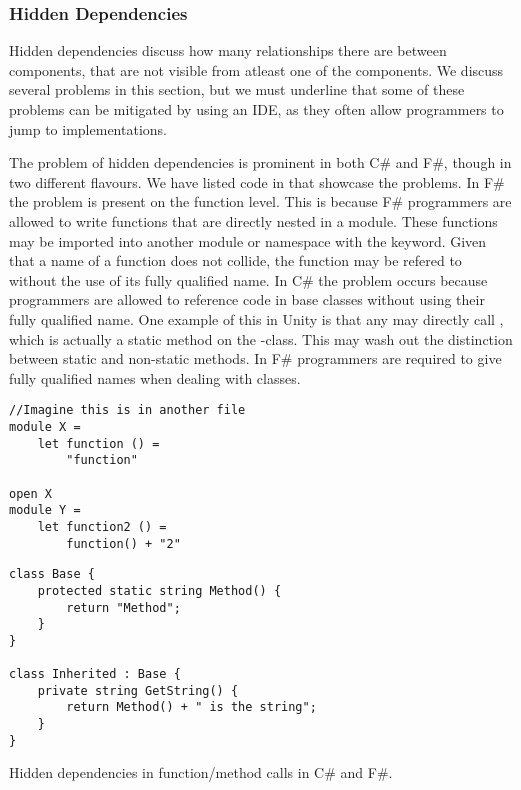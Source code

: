 \subsubsection{Hidden Dependencies}
Hidden dependencies discuss how many relationships there are between components, that are not visible from atleast one of the components. We discuss several problems in this section, but we must underline that some of these problems can be mitigated by using an \gls{IDE}, as they often allow programmers to jump to implementations.

The problem of hidden dependencies is prominent in both C\# and F\#, though in two different flavours. We have listed code in  that showcase the problems. In F\# the problem is present on the function level. This is because F\# programmers are allowed to write functions that are directly nested in a module. These functions may be imported into another module or namespace with the  keyword. Given that a name of a function does not collide, the function may be refered to without the use of its fully qualified name. In C\# the problem occurs because programmers are allowed to reference code in base classes without using their fully qualified name. One example of this in Unity is that any  may directly call , which is actually a static method on the -class. This may wash out the distinction between static and non-static methods. In F\# programmers are required to give fully qualified names when dealing with classes.

\begin{listing}[H]
    \begin{minipage}{.45\textwidth}
    \begin{verbatim}
//Imagine this is in another file
module X =
    let function () =
        "function"

open X
module Y =
    let function2 () =
        function() + "2"
    \end{verbatim}
    \end{minipage}
    \hfill
    \begin{minipage}{.45\textwidth}
    \begin{verbatim}
class Base {
    protected static string Method() {
        return "Method";
    }
}

class Inherited : Base {
    private string GetString() {
        return Method() + " is the string";
    }
}
    \end{verbatim}
    \end{minipage}
    \caption{Hidden dependencies in function/method calls in C\# and F\#.}
    \label{lst:hidden:dependencies}
    \end{listing}

